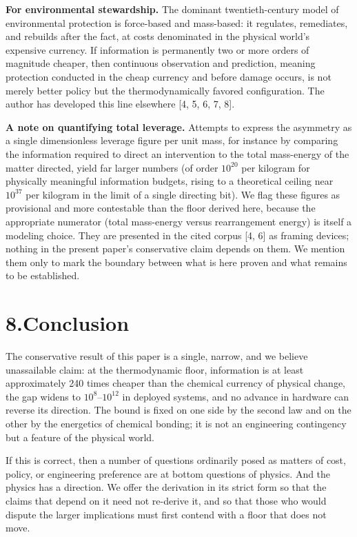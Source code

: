 \documentclass[11pt]{article}
\begin{document}
\textbf{For environmental stewardship.} The dominant twentieth-century model of environmental protection is force-based and mass-based: it regulates, remediates, and rebuilds after the fact, at costs denominated in the physical world's expensive currency. If information is permanently two or more orders of magnitude cheaper, then continuous observation and prediction, meaning protection conducted in the cheap currency and before damage occurs, is not merely better policy but the thermodynamically favored configuration. The author has developed this line elsewhere [4, 5, 6, 7, 8].

\textbf{A note on quantifying total leverage.} Attempts to express the asymmetry as a single dimensionless leverage figure per unit mass, for instance by comparing the information required to direct an intervention to the total mass-energy of the matter directed, yield far larger numbers (of order $10^{20}$ per kilogram for physically meaningful information budgets, rising to a theoretical ceiling near $10^{37}$ per kilogram in the limit of a single directing bit). We flag these figures as provisional and more contestable than the floor derived here, because the appropriate numerator (total mass-energy versus rearrangement energy) is itself a modeling choice. They are presented in the cited corpus [4, 6] as framing devices; nothing in the present paper's conservative claim depends on them. We mention them only to mark the boundary between what is here proven and what remains to be established.

\section*{8.\quad Conclusion}
The conservative result of this paper is a single, narrow, and we believe unassailable claim: at the thermodynamic floor, information is at least approximately 240 times cheaper than the chemical currency of physical change, the gap widens to $10^{8}$--$10^{12}$ in deployed systems, and no advance in hardware can reverse its direction. The bound is fixed on one side by the second law and on the other by the energetics of chemical bonding; it is not an engineering contingency but a feature of the physical world.

If this is correct, then a number of questions ordinarily posed as matters of cost, policy, or engineering preference are at bottom questions of physics. And the physics has a direction. We offer the derivation in its strict form so that the claims that depend on it need not re-derive it, and so that those who would dispute the larger implications must first contend with a floor that does not move.
\end{document}
